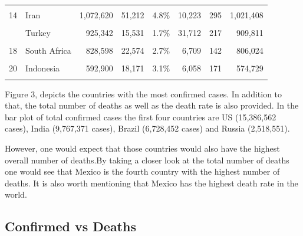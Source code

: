 \begin{table}[!h]
\begin{tabular}[t]{llrrrrrr}
\cellcolor{gray!6}{13} & \cellcolor{gray!6}{Poland} & \cellcolor{gray!6}{1,088,346} & \cellcolor{gray!6}{21,160} & \cellcolor{gray!6}{1.9\%} & \cellcolor{gray!6}{12,166} & \cellcolor{gray!6}{568} & \cellcolor{gray!6}{1,067,186}\\
14 & Iran & 1,072,620 & 51,212 & 4.8\% & 10,223 & 295 & 1,021,408\\
\cellcolor{gray!6}{15} & \cellcolor{gray!6}{Peru} & \cellcolor{gray!6}{976,621} & \cellcolor{gray!6}{36,401} & \cellcolor{gray!6}{3.7\%} & \cellcolor{gray!6}{2,709} & \cellcolor{gray!6}{127} & \cellcolor{gray!6}{940,220}\\
\addlinespace
16 & Turkey & 925,342 & 15,531 & 1.7\% & 31,712 & 217 & 909,811\\
\cellcolor{gray!6}{17} & \cellcolor{gray!6}{Ukraine} & \cellcolor{gray!6}{867,991} & \cellcolor{gray!6}{14,702} & \cellcolor{gray!6}{1.7\%} & \cellcolor{gray!6}{12,937} & \cellcolor{gray!6}{289} & \cellcolor{gray!6}{853,289}\\
18 & South Africa & 828,598 & 22,574 & 2.7\% & 6,709 & 142 & 806,024\\
\cellcolor{gray!6}{19} & \cellcolor{gray!6}{Belgium} & \cellcolor{gray!6}{597,643} & \cellcolor{gray!6}{17,603} & \cellcolor{gray!6}{2.9\%} & \cellcolor{gray!6}{3,071} & \cellcolor{gray!6}{96} & \cellcolor{gray!6}{580,040}\\
20 & Indonesia & 592,900 & 18,171 & 3.1\% & 6,058 & 171 & 574,729\\
\addlinespace
\bottomrule
\end{tabular}
\end{table}

Figure 3, depicts the countries with the most confirmed cases. In addition to that, the total number of deaths as well as the death rate is also provided. In the bar plot of total confirmed cases the first four countries are US (15,386,562 cases), India (9,767,371 cases), Brazil (6,728,452 cases) and Russia (2,518,551). 

However, one would expect that those countries would also have the highest overall number of deaths.By taking a closer look at the total number of deaths one would see that Mexico is the fourth country with the highest number of deaths. It is also worth mentioning that Mexico has the highest death rate in the world.

\newpage
\subsection{Confirmed vs Deaths}

